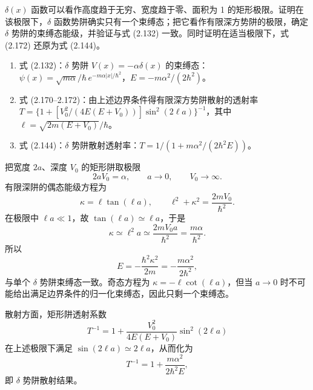 \begin{question}
$\delta(x)$ 函数可以看作高度趋于无穷、宽度趋于零、面积为 1 的矩形极限。证明在该极限下，$\delta$ 函数势阱确实只有一个束缚态；把它看作有限深方势阱的极限，确定 $\delta$ 势阱的束缚态能级，并验证与式 (2.132) 一致。同时证明在适当极限下，式 (2.172) 还原为式 (2.144)。

\par\smallskip
{}
\begin{enumerate}[leftmargin=2.2em,itemsep=0.12em,topsep=0.12em,parsep=0pt]
\item 式 (2.132)：$\delta$ 势阱 $V(x)=-\alpha\delta(x)$ 的束缚态：$\psi(x)=\sqrt{m\alpha}/\hbar\,e^{-m\alpha|x|/\hbar^2}$，$E=-m\alpha^2/(2\hbar^2)$。
\item 式 (2.170--2.172)：由上述边界条件得有限深方势阱散射的透射率 $T=\{1+[V_0^2/(4E(E+V_0))]\sin^2(2\ell a)\}^{-1}$，其中 $\ell=\sqrt{2m(E+V_0)}/\hbar$。
\item 式 (2.144)：$\delta$ 势阱散射透射率：$T=1/(1+m\alpha^2/(2\hbar^2E))$。
\end{enumerate}

\end{question}
\begin{solution}
把宽度 $2a$、深度 $V_0$ 的矩形阱取极限
\[
2aV_0=\alpha,
\qquad a\to0,
\qquad V_0\to\infty.
\]
有限深阱的偶态能级方程为
\[
\kappa=\ell\tan(\ell a),
\qquad
\ell^2+\kappa^2=\frac{2mV_0}{\hbar^2}.
\]
在极限中 $\ell a\ll1$，故 $\tan(\ell a)\simeq \ell a$，于是
\[
\kappa\simeq \ell^2a\simeq \frac{2mV_0a}{\hbar^2}=\frac{m\alpha}{\hbar^2}.
\]
所以
\[
E=-\frac{\hbar^2\kappa^2}{2m}=-\frac{m\alpha^2}{2\hbar^2},
\]
与单个 $\delta$ 势阱束缚态一致。奇态方程为 $\kappa=-\ell\cot(\ell a)$，但当 $a\to0$ 时不可能给出满足边界条件的归一化束缚态，因此只剩一个束缚态。

散射方面，矩形阱透射系数
\[
T^{-1}=1+\frac{V_0^2}{4E(E+V_0)}\sin^2(2\ell a)
\]
在上述极限下满足 $\sin(2\ell a)\simeq 2\ell a$，从而化为
\[
T^{-1}=1+\frac{m\alpha^2}{2\hbar^2E},
\]
即 $\delta$ 势阱散射结果。
\end{solution}

